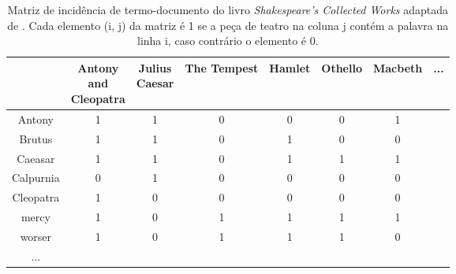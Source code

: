 \begin{table}[H]
    \centering
    \begin{tabular}{|c|c|c|c|c|c|c|c}
        \hline
        \diagbox{Palavra}{
            \raisebox{-1.27cm}{
                \rotatebox{90}{
                    \parbox{1.6cm}{\centering Peça \\ de teatro}
                }
            }
        } 
        & \makecell{Antony \\ and \\ Cleopatra} 
        & \makecell{Julius \\ Caesar} 
        & The Tempest 
        & Hamlet 
        & Othello 
        & Macbeth 
        & ... 
        \\ \hline
        Antony     & 1 & 1 & 0 & 0 & 0 & 1 & \\
        Brutus     & 1 & 1 & 0 & 1 & 0 & 0 & \\
        Caeasar    & 1 & 1 & 0 & 1 & 1 & 1 & \\
        Calpurnia  & 0 & 1 & 0 & 0 & 0 & 0 & \\
        Cleopatra  & 1 & 0 & 0 & 0 & 0 & 0 & \\
        mercy      & 1 & 0 & 1 & 1 & 1 & 1 & \\
        worser     & 1 & 0 & 1 & 1 & 1 & 0 & \\
        ...        & & & & & & & 
    \end{tabular}
    \caption{Matriz de incidência de termo-documento do livro \textit{Shakespeare’s Collected Works} adaptada de . Cada elemento (i, j) da matriz é 1 se a peça de teatro na coluna j contém a palavra na linha i, caso contrário o elemento é 0.}
    \label{tab:matriz-incidência-termo-documento}
\end{table}